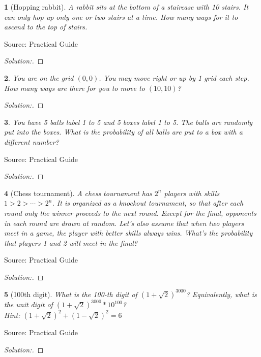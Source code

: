 \documentclass[10pt]{report}
\newtheorem{exe}{}[chapter]
\newenvironment{sol}{\begin{proof}[Solution:]}{\end{proof}}
\begin{document}
\begin{exe}[Hopping rabbit]
A rabbit sits at the bottom of a staircase with 10 stairs. It can only hop up only one or two stairs at a time. How many ways for it to ascend to the top of stairs.
\end{exe}
\begin{teacher}
Source: Practical Guide
\begin{sol}
\end{sol}
\end{teacher}

\begin{exe}
You are on the grid $(0, 0)$. You may move right or up by 1 grid each step. How many ways are there for you to move to $(10, 10)$?
\end{exe}
\begin{teacher}
\begin{sol}
\end{sol}
\end{teacher}

\begin{exe}
You have 5 balls label 1 to 5 and 5 boxes label 1 to 5. The balls are randomly put into the boxes. What is the probability of all balls are put to a box with a different number?
\end{exe}
\begin{teacher}
Source: Practical Guide
\begin{sol}
\end{sol}
\end{teacher}


\begin{exe}[Chess tournament]
A chess tournament has $2^n$ players with skills $1>2>\cdots>2^n$. It is organized as a
knockout tournament, so that after each round only the winner proceeds to the next
round. Except for the final, opponents in each round are drawn at random. Let's also
assume that when two players meet in a game, the player with better skills always wins.
What's the probability that players 1 and 2 will meet in the final?
\end{exe}
\begin{teacher}
Source: Practical Guide
\begin{sol}
\end{sol}
\end{teacher}

\begin{exe}[100th digit]
What is the 100-th digit of $(1+\sqrt{2})^3000$? Equivalently, what is the unit digit of $(1+\sqrt{2})^3000*10^100$?\\
Hint: $(1+\sqrt{2})^2 + (1-\sqrt{2})^2=6$

\end{exe}
\begin{teacher}
Source: Practical Guide
\begin{sol}
\end{sol}
\end{teacher}
\end{document}
